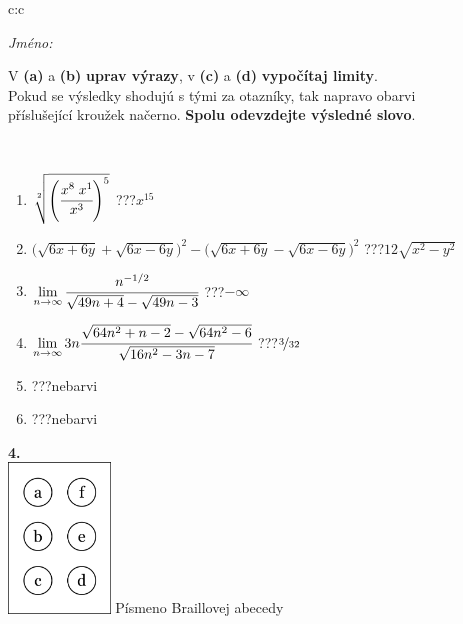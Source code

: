 \documentclass[10pt]{report}
\begin{document}
\begin{tabular}{c:c}
\begin{minipage}[c][104.5mm][t]{0.5\linewidth}
\begin{center}
\textit{Jméno:}\phantom{xxxxxxxxxxxxxxxxxxxxxxxxxxxxxxxxxxxxxxxxxxxxxxxxxxxxxxxxxxxxxxxxx}\\[5mm]
\begin{minipage}{0.95\linewidth}
\begin{center}
V \textbf{(a)} a \textbf{(b)} \textbf{uprav výrazy}, v \textbf{(c)} a \textbf{(d)} \textbf{vypočítaj limity}.\\Pokud se výsledky shodujú s tými za otazníky, tak napravo obarvi\\příslušející kroužek načerno. \textbf{Spolu odevzdejte výsledné slovo}.
\end{center}
\end{minipage}
\\[1mm]
\begin{minipage}{0.79\linewidth}
\begin{center}
\begin{varwidth}{\linewidth}
\begin{enumerate}
\small
\item $\sqrt[2]{\left(\cfrac{x^{8}\;x^{1}}{x^{3}}\right)^{5}}$\quad \dotfill\; ???\;\dotfill \quad $x^{15}$
\item {\footnotesize{\scriptsize$\big(\sqrt{6x+6y}+\sqrt{6x-6y}\big)^2-\big(\sqrt{6x+6y}-\sqrt{6x-6y}\big)^2$}\quad \dotfill\; ???\;\dotfill \quad $12\sqrt{x^2-y^2}$}
\item $\lim\limits_{n\to\infty}\cfrac{n^{-1/2}}{\sqrt{49n+4}-\sqrt{49n-3}}$\quad \dotfill\; ???\;\dotfill \quad $-\infty$
\item $\lim\limits_{n\to\infty}3n\cfrac{\sqrt{64n^2+n-2}-\sqrt{64n^2-6}}{\sqrt{16n^2-3n-7}}$\quad \dotfill\; ???\;\dotfill \quad $\nicefrac{3}{32}$
\item \quad \dotfill\; ???\;\dotfill \quad nebarvi
\item \quad \dotfill\; ???\;\dotfill \quad nebarvi
\end{enumerate}
\end{varwidth}
\end{center}
\end{minipage}
\begin{minipage}{0.20\linewidth}
\begin{center}
{\Huge\bfseries 4.} \\[2mm]
\includegraphics[height=40mm]{../images/braille.png}
{\small Písmeno Braillovej abecedy}
\end{center}
\end{minipage}
\end{center}
\end{minipage}
%
\end{tabular}
\end{document}
